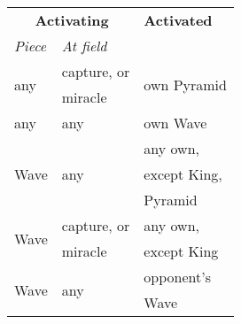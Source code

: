 \begin{table}[!h]
\centering
\begin{tabular}{ lll }
\toprule %
\multicolumn{2}{c}{ \textbf{Activating} }                               & \textbf{Activated}            \\
\cmidrule{1-2} %
\emph{Piece}                            & \emph{At field}               &                               \\
\midrule %
\multirow{2}{*}{any}                    & capture, or                   & \multirow{2}{*}{own Pyramid}  \\
                                        & miracle                       &                               \\
\cmidrule{1-3} %
any                                     & any                           & own Wave                      \\
\cmidrule{1-3} %
\multirow{3}{*}{Wave}                   & \multirow{3}{*}{any}          & any own,                      \\
                                        &                               & except King,                  \\
                                        &                               & Pyramid                       \\
\cmidrule{1-3} %
\multirow{2}{*}{Wave\footnotemark[1]}   & capture, or                   & any own,                      \\
                                        & miracle                       & except King                   \\
\cmidrule{1-3} %
\multirow{2}{*}{Wave}                   & \multirow{2}{*}{any}          & opponent's                    \\
                                        &                               & Wave                          \\

\end{tabular}
\end{table}
